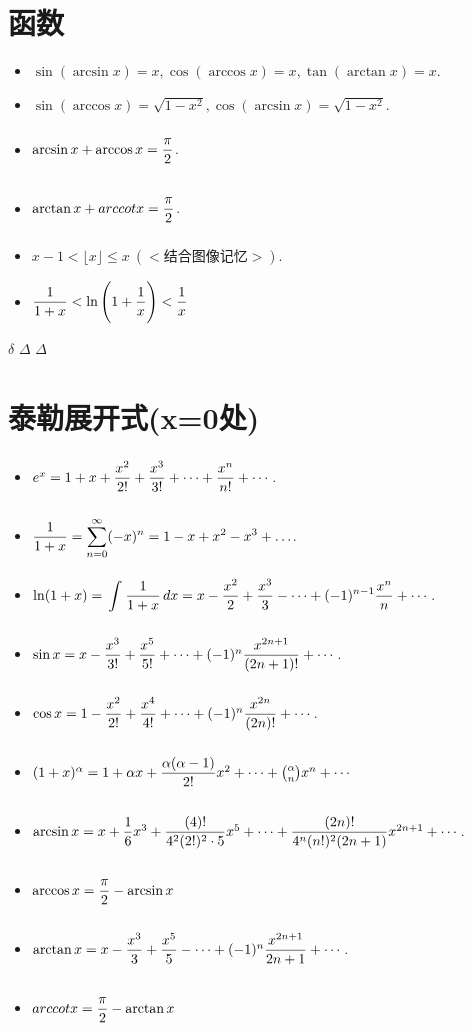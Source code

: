\documentclass[a4paper,12pt,oneside,fontset=none]{ctexbook}
\renewcommand{\leq}{\leqslant}
\let\olddfrac\dfrac
\renewcommand{\dfrac}[2]{
    \olddfrac{#1\vrule width 0pt height 1.15em depth 0em}{#2\vrule width 0pt height 0em depth 0.6em}
}
\let\oldint\int
\renewcommand{\int}{\displaystyle{\vrule width 0pt height 0em depth 0em}\oldint}
\let\oldsum\sum
\renewcommand{\sum}{\displaystyle\oldsum}
\numberwithin{equation}{chapter}
\begin{document}
\section{函数}
\begin{itemize}
    \item $\sin(\arcsin x) = x, \cos(\arccos x) = x, \tan(\arctan x) = x$.
    \item $\sin(\arccos x) = \sqrt{1 - x^2}, \cos(\arcsin x) = \sqrt{1 - x^2}$.
    \item $\arcsin x + \arccos x = \dfrac{\pi}{2}$.
    \item $\arctan x + arccot x = \dfrac{\pi}{2}$.
    \item $x-1 < \lfloor x \rfloor \leq x\ (<\text{结合图像记忆}>)$.
    \item $\dfrac{1}{1+x} < \ln\left(1+\dfrac{1}{x}\right) < \dfrac{1}{x}$
\end{itemize}
$\delta$ $\varDelta$  $\Delta $
\section{泰勒展开式(x=0处)}
\begin{itemize}
    \item $e^x = 1 + x + \dfrac{x^2}{2!} + \dfrac{x^3}{3!} + \cdots + \dfrac{x^n}{n!} + \cdots$.
    \item $\dfrac{1}{1+x} = \sum_{n=0}^{\infty} (-x)^n = 1-x+x^2-x^3+\ldots$.
    \item $\ln(1 + x) = \int_{}^{} \dfrac{1}{1+x}  \,dx = x - \dfrac{x^2}{2} + \dfrac{x^3}{3} - \cdots + (-1)^{n-1} \dfrac{x^n}{n} + \cdots$. 
    \item $\sin x = x - \dfrac{x^3}{3!} + \dfrac{x^5}{5!} + \cdots + (-1)^n \dfrac{x^{2n+1}}{(2n+1)!} + \cdots$.
    \item $\cos x = 1 - \dfrac{x^2}{2!} + \dfrac{x^4}{4!} + \cdots + (-1)^n \dfrac{x^{2n}}{(2n)!} + \cdots$.
    \item $(1+x)^\alpha = 1 + \alpha x + \dfrac{\alpha(\alpha - 1)}{2!}x^2 + \cdots + \binom{\alpha}{n} x^n + \cdots$
    \item $\arcsin x = x + \dfrac{1}{6}x^3 + \dfrac{(4)!}{4^2 (2!)^2 \cdot 5}x^5 + \cdots + \dfrac{(2n)!}{4^n (n!)^2 (2n + 1)} x^{2n+1} + \cdots$.
    \item $\arccos x = \dfrac{\pi}{2} - \arcsin x$ %
    \item $\arctan x = x - \dfrac{x^3}{3} + \dfrac{x^5}{5} - \cdots + (-1)^n \dfrac{x^{2n+1}}{2n+1} + \cdots$.
    \item $ arccot x = \dfrac{\pi}{2} - \arctan x$ %
    
\end{itemize}
\end{document}
